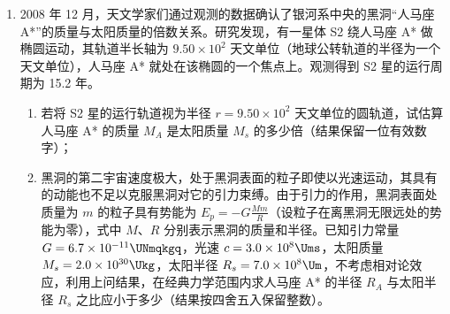 \documentclass[\gkver]{gaokaozhenti}
\begin{document}
\begin{enumerate}
{（1）小球在电场、磁场中恰能做匀速圆周运动，说明电场力和重力平衡（恒力不能充当圆周运动的向心力），有 $qE=mg$ ①，$E=\frac{mg}{q}$ ②。重力的方向竖直向下，电场力方向只能向上，由于小球带正电，所以电场强度方向竖直向上。

（2）小球做匀速圆周运动，$O'$ 为圆心，MN 为弦长，$\angle MO'P=\theta$，如图所示。设半径为 $r$，由几何关系知 $\frac{L}{2r}=\sin\theta$ ③。小球做匀速圆周运动的向心力由洛伦兹力提供，设小球做圆周运动的速率为 $v$，有 $qvB=\frac{mv^{2}}{r}$ ④。由速度的合成与分解知 $\frac{v_{0}}{v}=\cos\theta$ ⑤。由③④⑤式得 $v_{0}=\frac{qBL}{2m}\cot\theta$ ⑥。

（3）设小球到 M 点时的竖直分速度为 $v_{y}$，它与水平分速度的关系为 $v_{y}=v_{0}\tan\theta$ ⑦。由匀变速直线运动规律 $v_{y}^{2}=2gh$ ⑧。由⑥⑦⑧式得 $h=\frac{q^{2}B^{2}L^{2}}{8m^{2}g}$ ⑨。

}

\item
2008 年 12 月，天文学家们通过观测的数据确认了银河系中央的黑洞“人马座 A*”的质量与太阳质量的倍数关系。研究发现，有一星体 S2 绕人马座 A* 做椭圆运动，其轨道半长轴为 $9.50\times10^{2}$ 天文单位（地球公转轨道的半径为一个天文单位），人马座 A* 就处在该椭圆的一个焦点上。观测得到 S2 星的运行周期为 15.2 年。

\begin{enumerate}
	\item
	若将 S2 星的运行轨道视为半径 $r=9.50\times10^{2}$ 天文单位的圆轨道，试估算人马座 A* 的质量 $M_{A}$ 是太阳质量 $M_{s}$ 的多少倍（结果保留一位有效数字）；
	\item
	黑洞的第二宇宙速度极大，处于黑洞表面的粒子即使以光速运动，其具有的动能也不足以克服黑洞对它的引力束缚。由于引力的作用，黑洞表面处质量为 $m$ 的粒子具有势能为 $E_{p}=-G\frac{Mm}{R}$（设粒子在离黑洞无限远处的势能为零），式中 $M$、$R$ 分别表示黑洞的质量和半径。已知引力常量 $G=6.7\times10^{-11}\UNmqkgq$，光速 $c=3.0\times10^{8}\Ums$，太阳质量 $M_{s}=2.0\times10^{30}\Ukg$，太阳半径 $R_{s}=7.0\times10^{8}\Um$，不考虑相对论效应，利用上问结果，在经典力学范围内求人马座 A* 的半径 $R_{A}$ 与太阳半径 $R_{s}$ 之比应小于多少（结果按四舍五入保留整数）。
\end{enumerate}
\end{enumerate}
\end{document}
